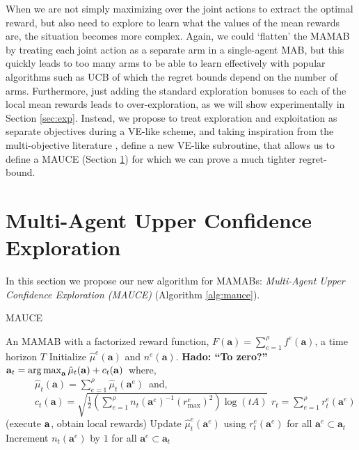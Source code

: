\documentclass{article}
\DeclareMathOperator*{\argmax}{arg\,max}
\newcommand{\est}{\hat{\mu}}
\def\hado#1{\textcolor{RubineRed}{\textbf{Hado: ``#1''}}}
\begin{document}
When we are not simply maximizing over the joint actions to extract the optimal reward, but also need to explore to learn what the values of the mean rewards are, the situation becomes more complex. Again, we could `flatten' the MAMAB by treating each joint action as a separate arm in a single-agent MAB, but this quickly leads to too many arms to be able to learn effectively with popular algorithms such as UCB \cite{auer2002finite} of which the regret bounds depend on the number of arms. Furthermore, just adding the standard exploration bonuses to each of the local mean rewards leads to over-exploration, as we will show experimentally in Section \ref{sec:exp}. Instead, we propose to treat exploration and exploitation as separate objectives during a VE-like scheme, and taking inspiration from the multi-objective literature \cite{roijers2015computing}, define a new VE-like subroutine, that allows us to define a MAUCE (Section \ref{sec:algo}) for which we can prove a much tighter regret-bound. 

\section{Multi-Agent Upper Confidence Exploration}\label{sec:algo}
In this section we propose our new algorithm for MAMABs: \emph{Multi-Agent Upper Confidence Exploration (MAUCE)} (Algorithm \ref{alg:mauce}). 
\begin{algorithm}[t]
   \caption{MAUCE}
   \label{alg:mauce}
\begin{algorithmic}[1]
    An MAMAB with a factorized reward function, $F(\mathbf{a}) = \sum^\rho_{e=1} f^e(\mathbf{a})$, a time horizon $T$
   \STATE Initialize $\hat{\mu}^e (\mathbf{a})$ and $n^e(\mathbf{a})$. \hado{To zero?}
   \STATE ${\bf a}_t = \argmax_{\bf a}  \est_t(\mathbf{a}) + c_t(\mathbf{a})\,$
   		where, \\ ~~~~~~$\est_t(\mathbf{a}) = \sum_{e=1}^\rho \est_t(\mathbf{a}^e) \,$ and, \\
~~~~~~$c_t(\mathbf{a}) = \sqrt{ \frac{1}{2} \left(\sum_{e=1}^\rho n_t(\mathbf{a}^e)^{-1} (r_{\max}^e)^2 \right) \log ( t A )} $
  \STATE $r_t\!=\!\sum_{e=1}^\rho\! r^e_t(\mathbf{a}^e)$ (execute $\bf a$, obtain local rewards)
   \STATE Update $\hat{\mu}^e_t (\mathbf{a}^e)$ using $r^e_t(\mathbf{a}^e)$  for all $\mathbf{a}^e \subset \mathbf{a}_t$
  \STATE Increment $n_t(\mathbf{a}^e)$ by $1$ for all $\mathbf{a}^e \subset \mathbf{a}_t$
   \ENDFOR
\end{algorithmic}
\end{algorithm}
\end{document}
